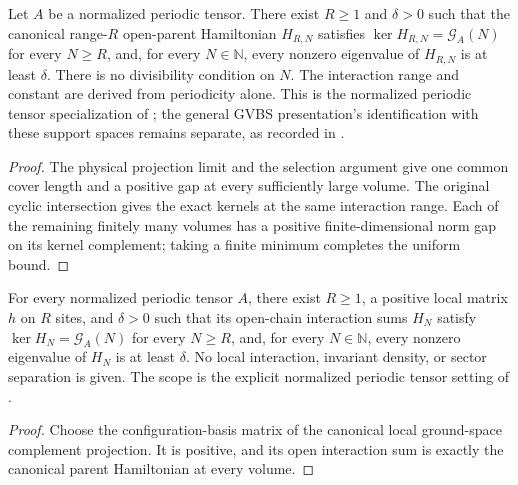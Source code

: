 \begin{lemma}
    \label{thm:periodic_open_parent_gap_all_volumes}
    \leanok

    Let $A$ be a normalized periodic tensor. There exist $R\ge1$ and
    $\delta>0$ such that the canonical range-$R$ open-parent Hamiltonian
    $H_{R,N}$ satisfies $\ker H_{R,N}=\mathcal G_A(N)$ for every $N\ge R$,
    and, for every $N\in\mathbb N$, every nonzero eigenvalue of $H_{R,N}$ is
    at least $\delta$.
    There is no divisibility condition on $N$. The interaction range and
    constant are derived from periodicity alone. This is the normalized
    periodic tensor specialization of
    \cite[Theorem 1.2 and Section 6]{Nachtergaele1996Spectral}; the general
    GVBS presentation's identification with these support spaces remains
    separate, as recorded in
    \cite{gap:nachtergaele96_infinite_volume_ground_projection}.
\end{lemma}
\begin{proof}\leanok
    The physical projection limit and the selection argument give one common
    cover length and a positive gap at every sufficiently large volume.
    The original cyclic intersection gives the exact kernels at the same
    interaction range. Each of the remaining finitely many volumes has a
    positive finite-dimensional norm gap on its kernel complement;
    taking a finite minimum completes the uniform bound.
\end{proof}

\begin{lemma}
    \label{thm:periodic_positive_parent_gap_all_volumes}
    \leanok

    For every normalized periodic tensor $A$, there exist $R\ge1$, a positive
    local matrix $h$ on $R$ sites, and $\delta>0$ such that its open-chain
    interaction sums $H_N$ satisfy
    $\ker H_N=\mathcal G_A(N)$ for every $N\ge R$, and, for every
    $N\in\mathbb N$, every nonzero eigenvalue of $H_N$ is at least $\delta$.
    No local interaction, invariant density, or sector separation is given.
    The scope is the explicit normalized periodic tensor setting of
    \cite[Theorem 1.2, Lemma existenceinteraction, and Section 6]{Nachtergaele1996Spectral}.
\end{lemma}
\begin{proof}\leanok
    Choose the configuration-basis matrix of the canonical local ground-space
    complement projection. It is positive, and its open interaction sum is
    exactly the canonical parent Hamiltonian at every volume.
\end{proof}

